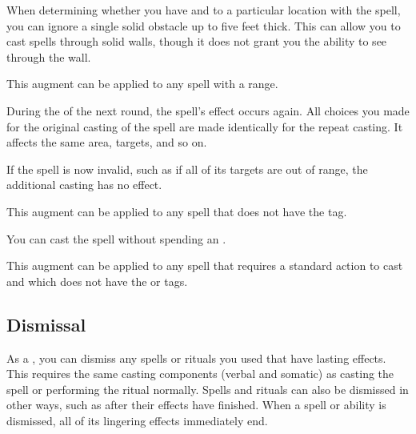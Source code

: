              When determining whether you have  and  to a particular location with the spell, you can ignore a single solid obstacle up to five feet thick.
            This can allow you to cast spells through solid walls, though it does not grant you the ability to see through the wall.
            \par This augment can be applied to any spell with a range.


             During the  of the next round, the spell's effect occurs again.
            All choices you made for the original casting of the spell are made identically for the repeat casting.
            It affects the same area, targets, and so on.

            If the spell is now invalid, such as if all of its targets are out of range, the additional casting has no effect.
            \par This augment can be applied to any spell that does not have the  tag.

             You can cast the spell without spending an .
            \par This augment can be applied to any spell that requires a standard action to cast and which does not have the  or  tags.

    \subsection{Dismissal}
        As a , you can dismiss any spells or rituals you used that have lasting effects.
        This requires the same casting components (verbal and somatic) as casting the spell or performing the ritual normally.
        Spells and rituals can also be dismissed in other ways, such as after their effects have finished.
        When a spell or ability is dismissed, all of its lingering effects immediately end.

